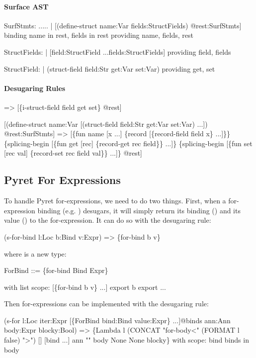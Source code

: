 \paragraph{Surface AST}
\begin{codes}
SurfStmts:
  .....
| [(define-struct name:Var fields:StructFields) @rest:SurfStmts]
  binding name in rest, fields in rest
  providing name, fields, rest

StructFields:
| [field:StructField ...fields:StructFields]
  providing field, fields

StructField:
| (struct-field field:Str get:Var set:Var)
  providing get, set
\end{codes}

\paragraph{Desugaring Rules}
\begin{codes}
=> [\{i-struct-field field get set\} @rest]
  
   [(define-struct name:Var
      [(struct-field field:Str get:Var set:Var) ...]) @rest:SurfStmts]
=> [\{fun name [x ...] \{record [\{record-field field x\} ...]\}\}
    \{splicing-begin [\{fun get [rec] \{record-get rec field\}\} ...]\}
    \{splicing-begin [\{fun set [rec val] \{record-set rec field val\}\} ...]\}
    @rest]
\end{codes}

\subsection{Pyret For Expressions}

To handle Pyret for-expressions, we need to do two things.
First, when a for-expression binding (e.g. ) desugars,
it will simply return its binding () and its value ()
to the for-expression. It can do so with the desugaring rule:
\begin{codes}
   (s-for-bind l:Loc b:Bind v:Expr)
=> \{for-bind b v\}
\end{codes}
where  is a new type:
\begin{codes}
  ForBind ::= \{for-bind Bind Expr\}

with list scope:
  [\{for-bind b v\} ...]
  export b
  export ...
\end{codes}

Then for-expressions can be implemented with the desugaring rule:
\begin{codes}
   (s-for l:Loc
          iter:Expr
          [\{ForBind bind:Bind value:Expr\} ...]@binds
          ann:Ann
          body:Expr
          blocky:Bool)
=> \{Lambda l (CONCAT "for-body<" (FORMAT l false) ">")
     [] [bind ...] ann "" body None None blocky\}
with scope:
  bind binds in body
\end{codes}

